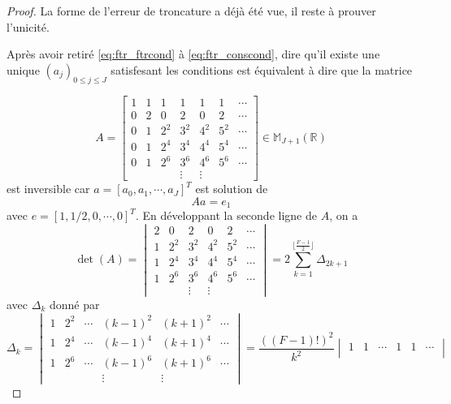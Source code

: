 \begin{proof}
La forme de l'erreur de troncature a déjà été vue, il reste à prouver l'unicité.

Après avoir retiré \eqref{eq:ftr_ftrcond} à \eqref{eq:ftr_conscond}, dire qu'il existe une unique $(a_j)_{0 \leq j \leq J}$ satisfesant les conditions est équivalent à dire que la matrice

\begin{equation}
A=\begin{bmatrix}
1 &  1  &  1  &  1  &  1  &  1  & \cdots\\  
0 &  2  &  0  &  2  &  0  & 2  & \cdots\\
0 &  1  & 2^2 & 3^2 & 4^2 & 5^2 & \cdots\\
0 &  1  & 2^4 & 3^4 & 4^4 & 5^4 & \cdots\\
0 &  1  & 2^6 & 3^6 & 4^6 & 5^6 & \cdots\\
&&& \vdots &  \vdots &
\end{bmatrix} \in \mathbb{M}_{J+1} \left( \mathbb{R} \right)
\end{equation}
est inversible car $a = [a_0, a_1, \cdots, a_J]^T$ est solution de 
\begin{equation}
A a = e_1
\end{equation}
avec $e = [1,1/2, 0,\cdots,0]^T$. En développant la seconde ligne de $A$, on a
\begin{equation}
\det ( A ) = \begin{vmatrix} 
2  &  0  &  2  &  0  & 2  & \cdots\\
1  & 2^2 & 3^2 & 4^2 & 5^2 & \cdots\\
1  & 2^4 & 3^4 & 4^4 & 5^4 & \cdots\\
1  & 2^6 & 3^6 & 4^6 & 5^6 & \cdots\\
& & \vdots &  \vdots &
\end{vmatrix} = 2 \sum_{k=1}^{\lfloor\frac{F-1}{2}\rfloor} \Delta_{2k+1}
\end{equation}
avec $\Delta_k$ donné par
\begin{equation}
\Delta_k = \begin{vmatrix} 
1 & 2^2 & \cdots & (k-1)^2 & (k+1)^2 & \cdots\\
1 & 2^4 & \cdots & (k-1)^4 & (k+1)^4 & \cdots\\
1 & 2^6 & \cdots & (k-1)^6 & (k+1)^6 & \cdots\\
&&& \vdots &  \vdots &
\end{vmatrix} = \dfrac{((F-1)!)^2}{k^2} \begin{vmatrix} 
1 & 1 & \cdots & 1 & 1 & \cdots\\

\end{vmatrix}
\end{equation}
\end{proof}
